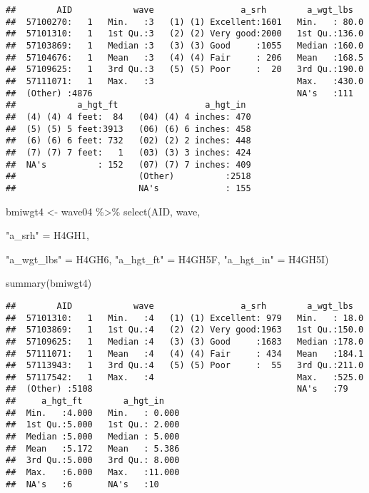\documentclass[
]{book}
\newenvironment{Shaded}{\begin{snugshade}}{\end{snugshade}}
\newcommand{\FunctionTok}[1]{\textcolor[rgb]{0.00,0.00,0.00}{#1}}
\newcommand{\NormalTok}[1]{#1}
\newcommand{\OtherTok}[1]{\textcolor[rgb]{0.56,0.35,0.01}{#1}}
\newcommand{\SpecialCharTok}[1]{\textcolor[rgb]{0.00,0.00,0.00}{#1}}
\newcommand{\StringTok}[1]{\textcolor[rgb]{0.31,0.60,0.02}{#1}}
\begin{document}
\begin{verbatim}
##        AID            wave                 a_srh        a_wgt_lbs    
##  57100270:   1   Min.   :3   (1) (1) Excellent:1601   Min.   : 80.0  
##  57101310:   1   1st Qu.:3   (2) (2) Very good:2000   1st Qu.:136.0  
##  57103869:   1   Median :3   (3) (3) Good     :1055   Median :160.0  
##  57104676:   1   Mean   :3   (4) (4) Fair     : 206   Mean   :168.5  
##  57109625:   1   3rd Qu.:3   (5) (5) Poor     :  20   3rd Qu.:190.0  
##  57111071:   1   Max.   :3                            Max.   :430.0  
##  (Other) :4876                                        NA's   :111    
##            a_hgt_ft                 a_hgt_in   
##  (4) (4) 4 feet:  84   (04) (4) 4 inches: 470  
##  (5) (5) 5 feet:3913   (06) (6) 6 inches: 458  
##  (6) (6) 6 feet: 732   (02) (2) 2 inches: 448  
##  (7) (7) 7 feet:   1   (03) (3) 3 inches: 424  
##  NA's          : 152   (07) (7) 7 inches: 409  
##                        (Other)          :2518  
##                        NA's             : 155
\end{verbatim}

\begin{Shaded}
\begin{Highlighting}[]
\NormalTok{bmiwgt4 }\OtherTok{\textless{}{-}}\NormalTok{ wave04 }\SpecialCharTok{\%\textgreater{}\%}
  \FunctionTok{select}\NormalTok{(AID,}
\NormalTok{         wave,}
         
         \StringTok{"a\_srh"} \OtherTok{=}\NormalTok{ H4GH1,}
         
         \StringTok{"a\_wgt\_lbs"} \OtherTok{=}\NormalTok{ H4GH6,}
         \StringTok{"a\_hgt\_ft"} \OtherTok{=}\NormalTok{ H4GH5F,}
         \StringTok{"a\_hgt\_in"} \OtherTok{=}\NormalTok{ H4GH5I)}

\FunctionTok{summary}\NormalTok{(bmiwgt4)}
\end{Highlighting}
\end{Shaded}

\begin{verbatim}
##        AID            wave                 a_srh        a_wgt_lbs    
##  57101310:   1   Min.   :4   (1) (1) Excellent: 979   Min.   : 18.0  
##  57103869:   1   1st Qu.:4   (2) (2) Very good:1963   1st Qu.:150.0  
##  57109625:   1   Median :4   (3) (3) Good     :1683   Median :178.0  
##  57111071:   1   Mean   :4   (4) (4) Fair     : 434   Mean   :184.1  
##  57113943:   1   3rd Qu.:4   (5) (5) Poor     :  55   3rd Qu.:211.0  
##  57117542:   1   Max.   :4                            Max.   :525.0  
##  (Other) :5108                                        NA's   :79     
##     a_hgt_ft        a_hgt_in     
##  Min.   :4.000   Min.   : 0.000  
##  1st Qu.:5.000   1st Qu.: 2.000  
##  Median :5.000   Median : 5.000  
##  Mean   :5.172   Mean   : 5.386  
##  3rd Qu.:5.000   3rd Qu.: 8.000  
##  Max.   :6.000   Max.   :11.000  
##  NA's   :6       NA's   :10
\end{verbatim}
\end{document}
